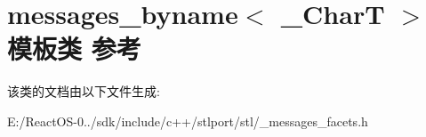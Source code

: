 \hypertarget{classmessages__byname}{}\section{messages\+\_\+byname$<$ \+\_\+\+CharT $>$ 模板类 参考}
\label{classmessages__byname}


该类的文档由以下文件生成\+:\begin{DoxyCompactItemize}
\item 
E\+:/\+React\+O\+S-\/0../sdk/include/c++/stlport/stl/\+\_\+messages\+\_\+facets.\+h\end{DoxyCompactItemize}
